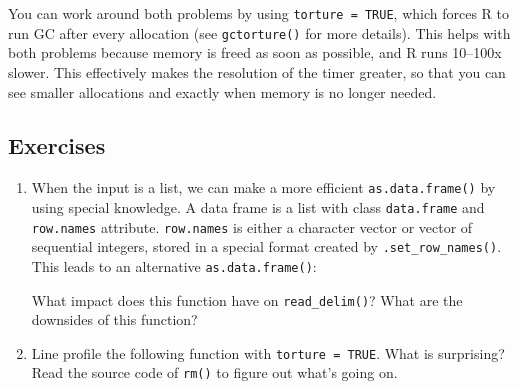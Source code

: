 You can work around both problems by using \texttt{torture = TRUE},
which forces R to run GC after every allocation (see
\texttt{gctorture()} for more details). This helps with both problems
because memory is freed as soon as possible, and R runs 10--100x slower.
This effectively makes the resolution of the timer greater, so that you
can see smaller allocations and exactly when memory is no longer needed.

\subsection{Exercises}

\begin{enumerate}
\def\labelenumi{\arabic{enumi}.}
\item
  When the input is a list, we can make a more efficient
  \texttt{as.data.frame()} by using special knowledge. A data frame is a
  list with class \texttt{data.frame} and \texttt{row.names} attribute.
  \texttt{row.names} is either a character vector or vector of
  sequential integers, stored in a special format created by
  \texttt{.set\_row\_names()}. This leads to an alternative
  \texttt{as.data.frame()}:

\begin{Shaded}
\begin{Highlighting}[]
\StringTok{ }
  \NormalTok{) <-}\StringTok{ }\NormalTok{(}\NormalTok{(x[[}\NormalTok{]]))}
\NormalTok{\}}
\end{Highlighting}
\end{Shaded}

  What impact does this function have on \texttt{read\_delim()}? What
  are the downsides of this function?
\item
  Line profile the following function with \texttt{torture = TRUE}. What
  is surprising? Read the source code of \texttt{rm()} to figure out
  what's going on.

\begin{Shaded}
\begin{Highlighting}[]
\StringTok{ } \NormalTok{) \{}
  \StringTok{ }\NormalTok{(}
\NormalTok{\}}
\end{Highlighting}
\end{Shaded}
\end{enumerate}

